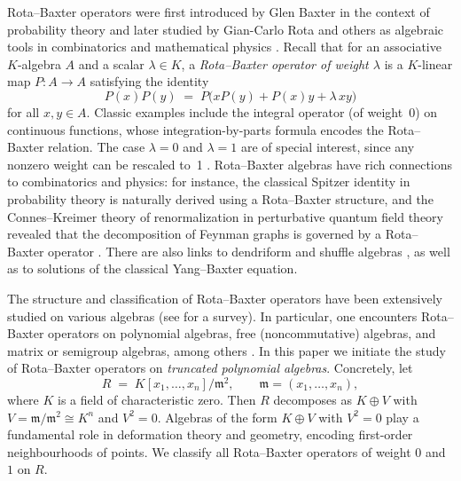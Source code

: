 \documentclass[a4paper,11pt]{elsarticle}
\theoremstyle{definition}
\theoremstyle{remark}
\newcommand{\m}{\mathfrak{m}}
\begin{document}
Rota--Baxter operators were first introduced by Glen Baxter in the context of probability theory \cite{Baxter} and later studied by Gian-Carlo Rota and others as algebraic tools in combinatorics and mathematical physics \cite{Rota}.  Recall that for an associative $K$-algebra $A$ and a scalar $\lambda\in K$, a {\em Rota--Baxter operator of weight $\lambda$} is a $K$-linear map $P:A\to A$ satisfying the identity 
\begin{equation}\label{RBdef}
    P(x)P(y) \;=\; P\bigl(xP(y)+P(x)y + \lambda\,xy\bigr)
\end{equation}
for all $x,y\in A$.  Classic examples include the integral operator (of weight~0) on continuous functions, whose integration-by-parts formula encodes the Rota--Baxter relation.  The case $\lambda=0$ and $\lambda=1$ are of special interest, since any nonzero weight can be rescaled to~1 \cite{Guo}.  Rota--Baxter algebras have rich connections to combinatorics and physics: for instance, the classical Spitzer identity in probability theory is naturally derived using a Rota--Baxter structure, and the Connes--Kreimer theory of renormalization in perturbative quantum field theory revealed that the decomposition of Feynman graphs is governed by a Rota--Baxter operator \cite{ConnesKreimer2000,ConnesKreimer1998,EG2007}.  There are also links to dendriform and shuffle algebras \cite{EG2008,Aguiar2000,GuoKeigher2000}, as well as to solutions of the classical Yang--Baxter equation.

The structure and classification of Rota--Baxter operators have been extensively studied on various algebras (see \cite{Guo} for a survey).  In particular, one encounters Rota--Baxter operators on polynomial algebras, free (noncommutative) algebras, and matrix or semigroup algebras, among others \cite{ZhengGuoRosenkranz2015,GuoZheng2021,Cartier1972,ZhengGuo2019,Gubarev2018,Tang2021,Gubarev2025}.  In this paper we initiate the study of Rota--Baxter operators on {\em truncated polynomial algebras}.  Concretely, let 
\[
R \;=\; K[x_1,\dots,x_n]/\m^2,\qquad \m=(x_1,\dots,x_n),
\]
where $K$ is a field of characteristic zero.  Then $R$ decomposes as $K\oplus V$ with $V=\m/\m^2\cong K^n$ and $V^2=0$.  Algebras of the form $K\oplus V$ with $V^2=0$ play a fundamental role in deformation theory and geometry, encoding first-order neighbourhoods of points.  We classify all Rota--Baxter operators of weight $0$ and $1$ on $R$.
\end{document}
